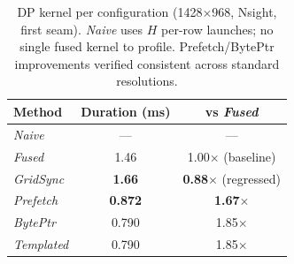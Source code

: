 \begin{table}[t]
\caption{DP kernel per configuration (1428$\times$968, Nsight, first seam).
\emph{Naive} uses $H$ per-row launches; no single fused kernel to profile.
Prefetch/BytePtr improvements verified consistent across standard resolutions.}
\label{tab:versions}
\centering
\begin{tabular}{@{}lcc@{}}
\toprule
\textbf{Method} & \textbf{Duration (ms)} & \textbf{vs \emph{Fused}} \\
\midrule
\emph{Naive}     & ---            & ---                        \\
\emph{Fused}     & 1.46           & 1.00$\times$ (baseline)    \\
\emph{GridSync}  & \textbf{1.66}  & \textbf{0.88$\times$} (regressed) \\
\emph{Prefetch}  & \textbf{0.872} & \textbf{1.67$\times$}      \\
\emph{BytePtr}   & 0.790          & 1.85$\times$               \\
\emph{Templated} & 0.790          & 1.85$\times$               \\
\bottomrule
\end{tabular}
\end{table}
